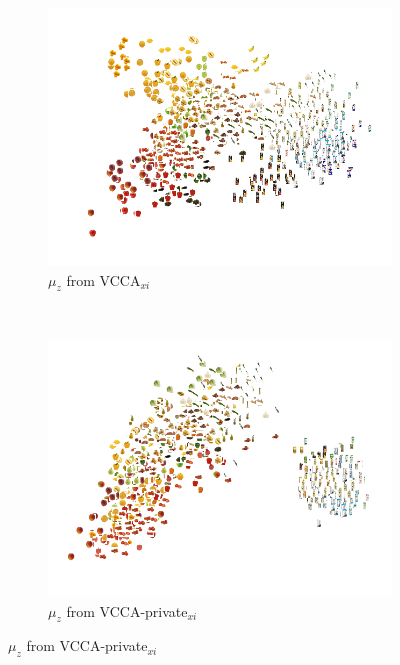 \begin{figure}[th!]
	\centering
	\begin{minipage}{\textwidth}
		\centering
		\begin{subfigure}[t]{0.48\textwidth}
			\centering
			\includegraphics[width=\textwidth]{PaperB/appendix/figures/vcca_private_xi/pca_vcca_xi.png}
			\caption{$\mu_{z}$ from VCCA$_{x i}$}
			\label{fig:pca_vcca_xi_z}
		\end{subfigure}~
		\begin{subfigure}[t]{0.48\textwidth}
			\centering
			\includegraphics[width=\textwidth]{PaperB/appendix/figures/vcca_private_xi/pca_z_vcca_private_xi_seed1.png}
			\caption{$\mu_{z}$ from VCCA-private$_{x i}$}
			\label{fig:pca_vcca_private_xi_z}

\end{subfigure}
\end{minipage}
\end{figure}
